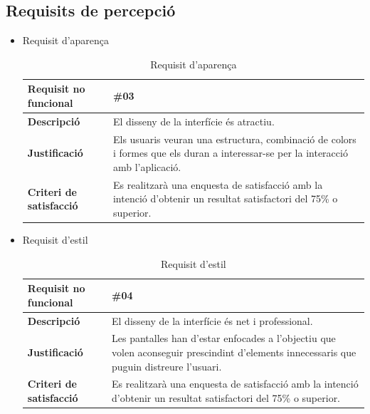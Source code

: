 \subsection{Requisits de percepció}

\begin{itemize}

\item{Requisit d'aparença}

\begin{table}[!h]
\begin{tabular}{|l|M|}
\hline
\textbf{Requisit no funcional }& \#03    \\ \hline
\textbf{Descripció} &  El disseny de la interfície és atractiu.
 \\ \hline
\textbf{Justificació} & Els usuaris veuran una estructura, combinació de colors i formes que els duran a interessar-se per la interacció amb l’aplicació.
\\ \hline
\textbf{Criteri de satisfacció} & Es realitzarà una enquesta de satisfacció amb la intenció d’obtenir un resultat satisfactori del 75\% o superior.
 \\ \hline
\end{tabular}
\label{}
\caption{Requisit d'aparença}
\end{table}

\clearpage

\item{Requisit d'estil}

\begin{table}[!h]
\begin{tabular}{|l|M|}
\hline
\textbf{Requisit no funcional }& \#04    \\ \hline
\textbf{Descripció} & El disseny de la interfície és net i professional.
 \\ \hline
\textbf{Justificació} & Les pantalles han d’estar enfocades a l’objectiu que
volen aconseguir prescindint d’elements innecessaris
que puguin distreure l’usuari.
  \\ \hline
\textbf{Criteri de satisfacció} & Es realitzarà una enquesta de satisfacció amb la intenció d’obtenir un resultat satisfactori del 75\% o superior.
  \\ \hline
\end{tabular}
\label{}
\caption{Requisit d'estil}
\end{table}

\end{itemize}

